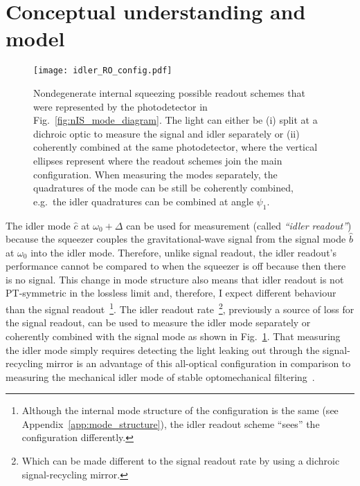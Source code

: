 \section{Conceptual understanding and model}
\label{sec:nIS_idlerRO_model}

\begin{figure}[!ht]
    \centering
    \texttt{[image: idler\_RO\_config.pdf]}
    \caption{Nondegenerate internal squeezing possible readout schemes that were represented by the photodetector in Fig.~\ref{fig:nIS_mode_diagram}. The light can either be (i) split at a dichroic optic to measure the signal and idler separately or (ii) coherently combined at the same photodetector, where the vertical ellipses represent where the readout schemes join the main configuration. When measuring the modes separately, the quadratures of the mode can be still be coherently combined, e.g.\ the idler quadratures can be combined at angle $\psi_1$.}
    \label{fig:idler_RO_config}
\end{figure}

The idler mode $\hat c$ at $\omega_0+\Delta$ can be used for measurement (called \emph{``idler readout''}) because the squeezer couples the gravitational-wave signal from the signal mode $\hat b$ at $\omega_0$ into the idler mode. Therefore, unlike signal readout, the idler readout's performance cannot be compared to when the squeezer is off because then there is no signal. This change in mode structure also means that idler readout is not PT-symmetric in the lossless limit and, therefore, I expect different behaviour than the signal readout~\footnote{Although the internal mode structure of the configuration is the same (see Appendix~\ref{app:mode_structure}), the idler readout scheme ``sees'' the configuration differently.}.
The idler readout rate~\footnote{Which can be made different to the signal readout rate by using a dichroic signal-recycling mirror.}, previously a source of loss for the signal readout, can be used to measure the idler mode separately or coherently combined with the signal mode as shown in Fig.~\ref{fig:idler_RO_config}. That measuring the idler mode simply requires detecting the light leaking out through the signal-recycling mirror is an advantage of this all-optical configuration in comparison to measuring the mechanical idler mode of stable optomechanical filtering~\cite{liEnhancingInterferometerSensitivity2021}.

